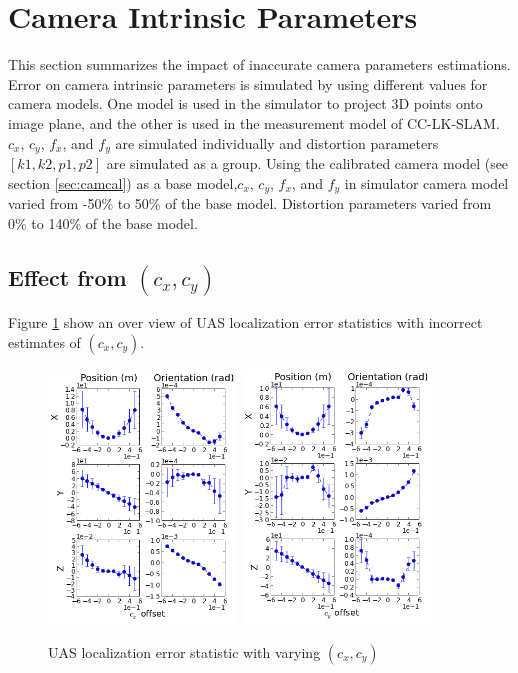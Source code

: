 \section{Camera Intrinsic Parameters}
This section summarizes the impact of inaccurate camera parameters 
estimations. Error on camera intrinsic parameters is simulated by using 
different values for camera models. One model is used in the simulator 
to project 3D points onto image plane, and the other is used in the 
measurement model of CC-LK-SLAM. $c_{x}$, $c_{y}$, $f_{x}$, and 
$f_{y}$ are simulated individually and distortion parameters $[k1, 
k2, p1, p2]$ are simulated as a group. Using the calibrated camera 
model (see section \ref{sec:camcal}) as a base model,$ c_{x}$, $c_{y}$, $f_{x}
$, and $f_{y}$ in simulator camera model varied from -50\% to 50\% of 
the base model. Distortion parameters varied from 0\% to 140\% of the 
base model. 

\subsection{Effect from $(c_{x}, c_{y})$}

Figure \ref{fig:simfig34-35} show an over view of UAS localization
error statistics with incorrect estimates of $ (c_{x}, c_{y})$.

\begin{figure}[h]
  \centering
  \includegraphics[width=5cm, keepaspectratio=true]{./Figures/SimulationFigures/Figure34.png}
  \includegraphics[width=5cm, keepaspectratio=true]{./Figures/SimulationFigures/Figure35.png}
  \caption{UAS localization error statistic with varying $(c_x, c_y)$}
  \label{fig:simfig34-35}
\end{figure}

